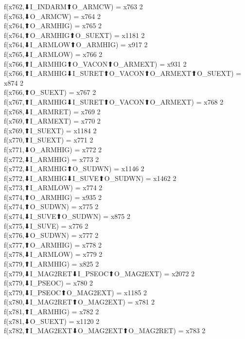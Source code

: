 f(x762,⬇I_INDARM⬆O_ARMCW) = x763 {2} \\
f(x763,⬇O_ARMCW) = x764 {2} \\
f(x764,⬆O_ARMHIG) = x765 {2} \\
f(x764,⬆O_ARMHIG⬆O_SUEXT) = x1181 {2} \\
f(x764,⬇I_ARMLOW⬆O_ARMHIG) = x917 {2} \\
f(x765,⬇I_ARMLOW) = x766 {2} \\
f(x766,⬆I_ARMHIG⬆O_VACON⬆O_ARMEXT) = x931 {2} \\
f(x766,⬆I_ARMHIG⬇I_SURET⬆O_VACON⬆O_ARMEXT⬆O_SUEXT) = x874 {2} \\
f(x766,⬆O_SUEXT) = x767 {2} \\
f(x767,⬆I_ARMHIG⬇I_SURET⬆O_VACON⬆O_ARMEXT) = x768 {2} \\
f(x768,⬇I_ARMRET) = x769 {2} \\
f(x769,⬆I_ARMEXT) = x770 {2} \\
f(x769,⬆I_SUEXT) = x1184 {2} \\
f(x770,⬆I_SUEXT) = x771 {2} \\
f(x771,⬇O_ARMHIG) = x772 {2} \\
f(x772,⬇I_ARMHIG) = x773 {2} \\
f(x772,⬇I_ARMHIG⬆O_SUDWN) = x1146 {2} \\
f(x772,⬇I_ARMHIG⬇I_SUVE⬆O_SUDWN) = x1462 {2} \\
f(x773,⬆I_ARMLOW) = x774 {2} \\
f(x774,⬆O_ARMHIG) = x935 {2} \\
f(x774,⬆O_SUDWN) = x775 {2} \\
f(x774,⬇I_SUVE⬆O_SUDWN) = x875 {2} \\
f(x775,⬇I_SUVE) = x776 {2} \\
f(x776,⬇O_SUDWN) = x777 {2} \\
f(x777,⬆O_ARMHIG) = x778 {2} \\
f(x778,⬇I_ARMLOW) = x779 {2} \\
f(x779,⬆I_ARMHIG) = x825 {2} \\
f(x779,⬇I_MAG2RET⬇I_PSEOC⬆O_MAG2EXT) = x2072 {2} \\
f(x779,⬇I_PSEOC) = x780 {2} \\
f(x779,⬇I_PSEOC⬆O_MAG2EXT) = x1185 {2} \\
f(x780,⬇I_MAG2RET⬆O_MAG2EXT) = x781 {2} \\
f(x781,⬆I_ARMHIG) = x782 {2} \\
f(x781,⬇O_SUEXT) = x1120 {2} \\
f(x782,⬆I_MAG2EXT⬇O_MAG2EXT⬆O_MAG2RET) = x783 {2} \\
